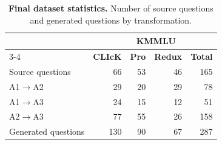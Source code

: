\begin{table}[t]
\centering
\small
\caption{\textbf{Final dataset statistics.} Number of source questions and generated questions by transformation.}
\label{tab:stats}
\begin{tabular}{@{}lrrrr@{}}
\toprule
 & & \multicolumn{2}{c}{\textbf{KMMLU}} & \\
\cmidrule(lr){3-4}
 & \textbf{CLIcK} & \textbf{Pro} & \textbf{Redux} & \textbf{Total} \\
\midrule
Source questions    & 66  & 53 & 46 & 165 \\
\midrule
A1$\rightarrow$A2   & 29  & 20 & 29 & 78  \\
A1$\rightarrow$A3   & 24  & 15 & 12 & 51  \\
A2$\rightarrow$A3   & 77  & 55 & 26 & 158 \\
\midrule
Generated questions & 130 & 90 & 67 & 287 \\
\bottomrule
\end{tabular}
\end{table}